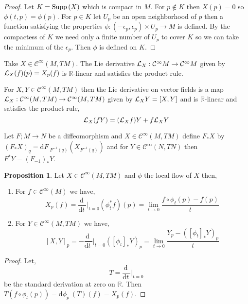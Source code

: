 \documentclass[12pt]{extarticle}
\newcommand{\R}{\mathbb{R}}
\renewcommand{\d}[1]{ \mathrm{d}#1 \:}
\newcommand{\deriv}[2]{\frac{\d{#1}}{\d{#2}}}
\theoremstyle{definition}
\newtheorem{proposition}[theorem]{Proposition}
\newenvironment{definition}[1][Definition:]{\begin{trivlist}
\item[\hskip \labelsep {\bfseries #1}]}{\end{trivlist}}
\newcommand{\C}[1]{\mathcal{C}^{#1}}
\begin{document}
\begin{proof}
Let $K = \mathrm{Supp}\left( X \right)$ which is compact in $M$. For $p \notin K$ then $X(p) = 0$ so $\phi(t, p) = \phi(p)$. For $p \in K$ let $U_p$ be an open neighborhood of $p$ then a function satisfying the properties $\phi : (-\epsilon_p, \epsilon_p) \times U_p \to M$ is defined. By the compactess of $K$ we need only a finite number of $U_p$ to cover $K$ so we can take the minimum of the $\epsilon_p$. Then $\phi$ is defined on $K$. 
\end{proof}

\begin{definition}
Take $X \in \C{\infty}(M, TM)$. The Lie derivative $\L_X : \C{\infty}{M} \to \C{\infty}{M}$ given by $\mathcal{L}_X(f)(p) = X_p(f)$ is $\R$-linear and satisfies the product rule. 
\end{definition}

\begin{definition}
For $X,Y \in \C{\infty}(M, TM)$ then the Lie derivative on vector fields is a map $\L_X : \C{\infty}(M, TM) \to \C{\infty}(M, TM)$ given by $\mathcal{L}_X Y = [X, Y]$ and is $\R$-linear and satisfies the product rule,
\[ \mathcal{L}_X(fY) = (\mathcal{L}_X f) Y + f \mathcal{L}_X Y \]
\end{definition}

\begin{definition}
Let $F ; M \to N$ be a diffeomorphism and $X \in \C{\infty}(M, TM)$ define $F_* X$ by $(F_* X)_q =  \d{F}_{F^{-1}(q)}  \left( X_{F^{-1}(q)} \right)$ and for $Y \in \C{\infty}(N, TN)$ then $F^* Y = (F_{-1})_* Y$. 
\end{definition}

\begin{proposition}
Let $X \in \C{\infty}(M, TM)$ and $\phi$ the local flow of $X$ then,
\begin{enumerate}
\item For $f \in \C{\infty}(M)$ we have,
\[ X_p(f) = \deriv{}{t} \bigg|_{t = 0} \left( \phi_t^* f \right)(p) = \lim_{t \to 0} \frac{f \circ \phi_t(p) - f(p)}{t} \]
\item For $Y \in \C{\infty}(M, TM)$ we have,
\[ [X, Y]_p = - \deriv{}{t} \bigg|_{t = 0} \left( [\phi_t]_* Y \right)_p = \lim_{t \to 0} \frac{Y_p - ([\phi_t]_* Y)_p}{t} \]
\end{enumerate}
\end{proposition}

\begin{proof}
Let,
\[ T = \deriv{}{t} \bigg|_{t = 0}\]
be the standard derivation at zero on $\R$. Then $T(f \circ \phi_t(p)) = \d{\phi_p}(T)(f) = X_p(f)$. 
\end{proof}
\end{document}
